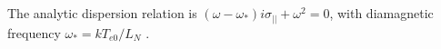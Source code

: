 \documentclass[12pt]{article}
\begin{document}
The analytic dispersion relation is $\left(\omega - \omega_*\right)i\sigma_{||} + \omega^2 = 0$, with
diamagnetic frequency $\omega_* = k T_{e0} / L_N$ \cite{umansky-2008-tests}.

\begin{figure}[htbp!]
\centering
{}
\end{figure}
\end{document}
